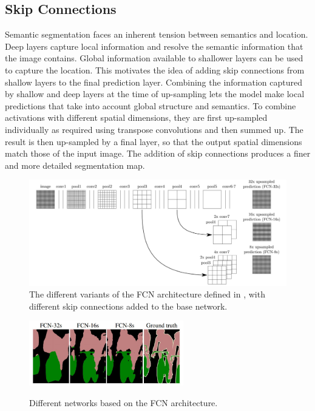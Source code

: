 \documentclass[12pt, a4paper]{report}
\begin{document}
\subsection{Skip Connections}
Semantic segmentation faces an inherent tension between semantics and location. Deep layers capture local information and resolve the semantic information that the image contains. Global information available to shallower layers can be used to capture the location. This motivates the idea of adding skip connections from shallow layers to the final prediction layer. Combining the information captured by shallow and deep layers at the time of up-sampling lets the model make local predictions that take into account global structure and semantics. To combine activations with different spatial dimensions, they are first up-sampled individually as required using transpose convolutions and then summed up. The result is then up-sampled by a final layer, so that the output spatial dimensions match those of the input image. The addition of skip connections produces a finer and more detailed segmentation map.\cite{long2015fully}
\begin{figure}[h]
\centering
\includegraphics[width=\textwidth]{fcn2.jpg}
\caption{The different variants of the FCN architecture defined in \cite{long2015fully}, with different skip connections added to the base network.}
\end{figure}
\begin{figure}[h]
\centering
\includegraphics[width=0.6\textwidth]{fcn3.jpg}
\caption{Different networks based on the FCN architecture.}
\cite{long2015fully}
\end{figure}
\end{document}
